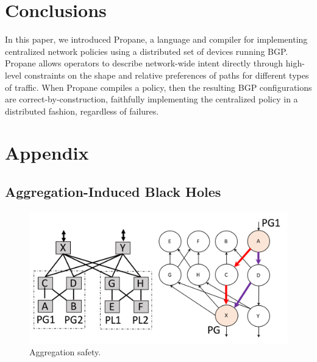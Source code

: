 \documentclass{sig-alternate-10pt}
\newcommand{\sysname}{{\small \sf Propane}\xspace}
\providecommand{\DIFaddend}{} %
\begin{document}
\DIFaddend %
%
%

\section{Conclusions}
\label{sec:conclusions}

In this paper, we introduced \sysname, a language and compiler for implementing centralized network policies using a distributed set of devices running BGP. Propane allows operators to describe network-wide intent directly through high-level constraints on the shape and relative preferences of paths for different types of traffic. When \sysname compiles a policy, then the resulting BGP configurations are correct-by-construction, faithfully implementing the centralized policy in a distributed fashion, regardless of failures.



%
%
%
%

\section*{Appendix}
\label{sec:appendix}

\renewcommand\thesubsection{\Alph{subsection}}

\subsection{Aggregation-Induced Black Holes}
\label{sec:black-holes}

\begin{figure}[t!]
  \centering
  \includegraphics[width=\columnwidth]{figures/aggregation}
  \caption{Aggregation safety.}
  \label{fig:aggregation-safety}
  \vspace{-1em}
\end{figure}
\end{document}
